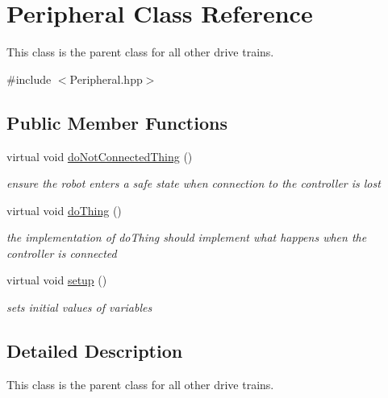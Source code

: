 \hypertarget{class_peripheral}{}\section{Peripheral Class Reference}
\label{class_peripheral}


This class is the parent class for all other drive trains.  




{\ttfamily \#include $<$Peripheral.\+hpp$>$}

\subsection*{Public Member Functions}
\begin{DoxyCompactItemize}
\item 
\mbox{\label{class_peripheral_a331e23603fba1cebb2d4745d46ed2bfe}} 
virtual void \mbox{\hyperlink{class_peripheral_a331e23603fba1cebb2d4745d46ed2bfe}{do\+Not\+Connected\+Thing}} ()
\begin{DoxyCompactList}\small\item\em ensure the robot enters a safe state when connection to the controller is lost \end{DoxyCompactList}\item 
\mbox{\label{class_peripheral_a8643ea34b0c89019aeff10b0d2667e46}} 
virtual void \mbox{\hyperlink{class_peripheral_a8643ea34b0c89019aeff10b0d2667e46}{do\+Thing}} ()
\begin{DoxyCompactList}\small\item\em the implementation of do\+Thing should implement what happens when the controller is connected \end{DoxyCompactList}\item 
\mbox{\label{class_peripheral_a2ad7fea98c49d0d319bfa17ca4dcff6c}} 
virtual void \mbox{\hyperlink{class_peripheral_a2ad7fea98c49d0d319bfa17ca4dcff6c}{setup}} ()
\begin{DoxyCompactList}\small\item\em sets initial values of variables \end{DoxyCompactList}\end{DoxyCompactItemize}


\subsection{Detailed Description}
This class is the parent class for all other drive trains. 

